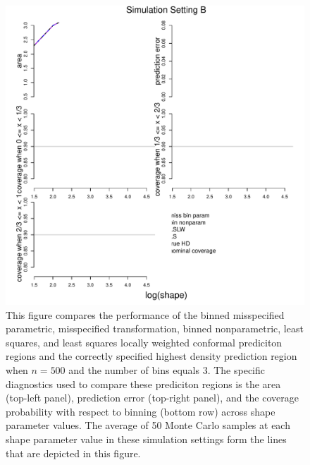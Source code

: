 \documentclass[11pt]{article}\usepackage[]{graphicx}\usepackage[]{color}
\makeatletter
\def\maxwidth{ %
  \ifdim\Gin@nat@width>\linewidth
    \linewidth
  \else
    \Gin@nat@width
  \fi
}
\newenvironment{knitrout}{}{} %
\makeatother
\begin{document}
\newpage
\begin{figure}[h!]
\begin{center}
\begin{knitrout}
\color{fgcolor}
\includegraphics[width=\maxwidth]{figure/Fig-misspec-500-1} 

\end{knitrout}
\end{center}
\caption{This figure compares the performance of the 
  binned misspecified parametric, 
  misspecified transformation, 
  binned nonparametric,
  least squares, and 
  least squares locally weighted conformal prediciton regions and the 
  correctly specified highest density prediction region when $n = 500$ and the 
  number of bins equals 3.  
  The specific diagnostics used to compare these prediciton regions is the 
    area (top-left panel),
    prediction error (top-right panel), and
    the coverage probability with respect to binning (bottom row) 
    across shape parameter values.
  The average of 50 Monte Carlo samples at each shape parameter value in 
  these simulation settings form the lines that are depicted in this figure.}
\label{Fig:misspec.500}
\end{figure}
\end{document}
